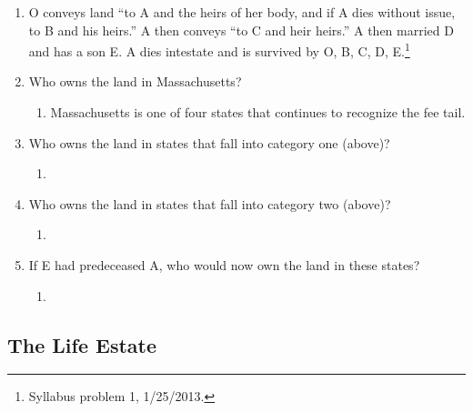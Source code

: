 \begin{enumerate}
    \item O conveys land ``to A and the heirs of her body, and if A dies 
    without issue, to B and his heirs.'' A then conveys ``to C and heir 
    heirs.'' A then married D and has a son E. A dies intestate and is 
    survived by O, B, C, D, E.\footnote{Syllabus problem 1, 1/25/2013.}
    \item Who owns the land in Massachusetts?
    \begin{enumerate}
        \item Massachusetts is one of four states that continues to recognize 
        the fee tail. %
    \end{enumerate}
    \item Who owns the land in states that fall into category one (above)?
    \begin{enumerate}
        \item %
    \end{enumerate}
    \item Who owns the land in states that fall into category two (above)?
    \begin{enumerate}
        \item %
    \end{enumerate}
    \item If E had predeceased A, who would now own the land in these states?
    \begin{enumerate}
        \item %
    \end{enumerate}
\end{enumerate}

\subsection{The Life Estate}

